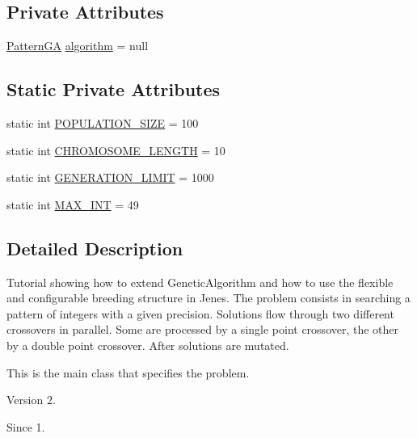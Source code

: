 \subsection*{Private Attributes}
\begin{DoxyCompactItemize}
\item 
\hyperlink{classjenes_1_1tutorials_1_1problem2_1_1_pattern_g_a}{Pattern\-G\-A} \hyperlink{classjenes_1_1tutorials_1_1problem2_1_1_pattern_problem_a038dad1059412959497267f6dc4ddf80}{algorithm} = null
\end{DoxyCompactItemize}
\subsection*{Static Private Attributes}
\begin{DoxyCompactItemize}
\item 
static int \hyperlink{classjenes_1_1tutorials_1_1problem2_1_1_pattern_problem_a472c770e5238935d4495ede668dc019c}{P\-O\-P\-U\-L\-A\-T\-I\-O\-N\-\_\-\-S\-I\-Z\-E} = 100
\item 
static int \hyperlink{classjenes_1_1tutorials_1_1problem2_1_1_pattern_problem_ad6c4c924d84e800837c7d9dc14e54cb7}{C\-H\-R\-O\-M\-O\-S\-O\-M\-E\-\_\-\-L\-E\-N\-G\-T\-H} = 10
\item 
static int \hyperlink{classjenes_1_1tutorials_1_1problem2_1_1_pattern_problem_aa47cea169d4f1fff3129d36e6b189443}{G\-E\-N\-E\-R\-A\-T\-I\-O\-N\-\_\-\-L\-I\-M\-I\-T} = 1000
\item 
static int \hyperlink{classjenes_1_1tutorials_1_1problem2_1_1_pattern_problem_afe5dfaf22b9bb517a24c95b3101b3e0d}{M\-A\-X\-\_\-\-I\-N\-T} = 49
\end{DoxyCompactItemize}


\subsection{Detailed Description}
Tutorial showing how to extend {\ttfamily Genetic\-Algorithm} and how to use the flexible and configurable breeding structure in Jenes. The problem consists in searching a pattern of integers with a given precision. Solutions flow through two different crossovers in parallel. Some are processed by a single point crossover, the other by a double point crossover. After solutions are mutated.

This is the main class that specifies the problem.

\begin{DoxyVersion}{Version}
2. 
\end{DoxyVersion}
\begin{DoxySince}{Since}
1. 
\end{DoxySince}


